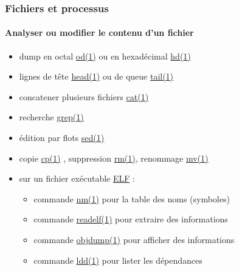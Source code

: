 \documentclass[xcolor=svgnames,final,smaller,a4]{beamer}
\begin{document}
\begin{frame}
  \frametitle{Fichiers et processus}
  \framesubtitle{Analyser ou modifier le contenu d'un fichier}

  \begin{itemize}
    
    \item dump en octal  \href{https://man7.org/linux/man-pages/man1/od.1.html}{od(1)} ou en hexadécimal \href{https://man7.org/linux/man-pages/man1/hd.1.html}{hd(1)} 

    \item lignes de tête \href{https://man7.org/linux/man-pages/man1/head.1.html}{head(1)}  ou de queue \href{https://man7.org/linux/man-pages/man1/tail.1.html}{tail(1)} 

    \item concatener plusieurs fichiers \href{https://man7.org/linux/man-pages/man1/cat.1.html}{cat(1)}
    \item recherche  \href{https://man7.org/linux/man-pages/man1/grep.1.html}{grep(1)}
    \item édition par flots  \href{https://man7.org/linux/man-pages/man1/sed.1.html}{sed(1)}
      
    \item copie \href{https://man7.org/linux/man-pages/man1/cp.1.html}{cp(1)} , suppression \href{https://man7.org/linux/man-pages/man1/rm.1.html}{rm(1)}, renommage \href{https://man7.org/linux/man-pages/man1/mv.1.html}{mv(1)}

    \item sur un fichier exécutable \href{https://fr.wikipedia.org/wiki/Executable_and_Linkable_Format}{ELF} :

      \begin{itemize}
      \item commande  \href{https://man7.org/linux/man-pages/man1/nm.1.html}{nm(1)} pour la table des noms (symboles)

        \item  commande  \href{https://man7.org/linux/man-pages/man1/readelf.1.html}{readelf(1)} pour extraire des informations
        \item  commande  \href{https://man7.org/linux/man-pages/man1/objdump.1.html}{objdump(1)} pour afficher des informations
        \item  commande  \href{https://man7.org/linux/man-pages/man1/ldd.1.html}{ldd(1)} pour lister les dépendances
      \end{itemize}
  \end{itemize}
\end{frame}
      
\end{document}
